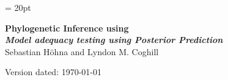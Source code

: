 \documentclass[11pt]{article}
\begin{document}
\renewcommand{\headrulewidth}{0.5pt}
\headsep = 20pt
\lhead{ }

\thispagestyle{plain}
\begin{center}

\textbf{\LARGE Phylogenetic Inference using \RevBayes}\\\vspace{2mm}
\textbf{\it{\Large Model adequacy testing using Posterior Prediction}}\\\vspace{2mm}
\vspace{1cm}
{\Large Sebastian H{\"o}hna and Lyndon M. Coghill}
\vspace{1cm}
\end{center}

\def \ResourcePath {./}
\def \GlobalResourcePath {../}


Version dated: \today
\end{document}
